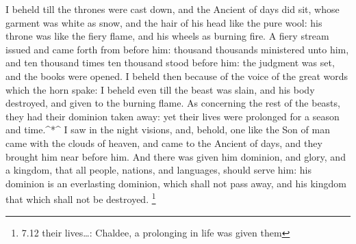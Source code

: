  I beheld till the thrones were cast down, and the Ancient
of days did sit, whose garment was white as snow, and the hair of his
head like the pure wool: his throne was like the fiery flame, and his
wheels as burning fire.  A fiery stream issued and came
forth from before him: thousand thousands ministered unto him, and ten
thousand times ten thousand stood before him: the judgment was set, and
the books were opened.  I beheld then because of the voice
of the great words which the horn spake: I beheld even till the beast
was slain, and his body destroyed, and given to the burning flame.
 As concerning the rest of the beasts, they had their
dominion taken away: yet their lives were prolonged for a season and
time.\^{}*\^{}  I saw in the night visions, and, behold,
one like the Son of man came with the clouds of heaven, and came to the
Ancient of days, and they brought him near before him.  And
there was given him dominion, and glory, and a kingdom, that all people,
nations, and languages, should serve him: his dominion is an everlasting
dominion, which shall not pass away, and his kingdom that which shall
not be destroyed. \footnote{7.12 their lives\ldots: Chaldee, a
  prolonging in life was given them}

